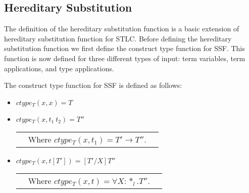\subsection{Hereditary Substitution}
\label{subsec:the_hereditary_substitution_function}
The definition of the hereditary substitution function is a basic
extension of hereditary substitution function for STLC.  Before
defining the hereditary substitution function we first define the
construct type function for SSF.  This function is now defined for
three different types of input: term variables, term applications, and
type applications.
\begin{definition}
  \label{def:ctype_function_ssf}
  The construct type function for SSF is defined as follows:
  \begin{itemize}
  \item[] $ctype_T(x,x) = T$
  \item[] $ctype_T(x,t_1\ t_2) = T''$\\
    \begin{tabular}{lll}
      & Where $ctype_T(x,t_1) = T' \to T''$.
    \end{tabular}    
  \item[] $ctype_T(x,t[T']) = [T'/X]T''$\\
    \begin{tabular}{lll}
      & Where $ctype_T(x,t) = \forall X:*_l.T''$.
    \end{tabular}    
  \end{itemize}
\end{definition}

